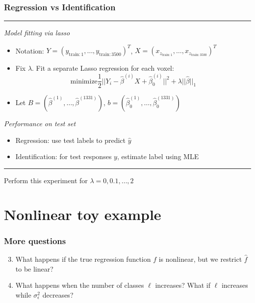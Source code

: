 \documentclass{beamer}
\begin{document}
\begin{frame}
\frametitle{Regression vs Identification}
\noindent\rule[0.5ex]{\linewidth}{0.5pt}
\emph{Model fitting via lasso}
\begin{itemize}
\item Notation: $Y = (y_{\text{train}: 1},\hdots, y_{\text{train}:3500})^T$, $X = (x_{z_{\text{train}: 1}},\hdots, x_{z_{\text{train}:3500}})^T$
\item Fix $\lambda$.  Fit a separate Lasso regression for each voxel:
\[
\text{minimize} \frac{1}{2}||Y_i - \hat{\beta}^{(i)} X + \hat{\beta}_0^{(i)}||^2 + \lambda ||\hat{\beta}||_1
\]
\item Let $B = (\hat{\beta}^{(1)},\hdots, \hat{\beta}^{(1331)})$, $b = (\hat{\beta}_0^{(1)},\hdots, \hat{\beta}_0^{(1331)})$
\end{itemize}
\emph{Performance on test set}
\begin{itemize}
\item Regression: use test labels to predict $\hat{y}$
\item Identification: for test responses $y$, estimate label using MLE
\end{itemize}
\noindent\rule[0.5ex]{\linewidth}{0.5pt}
\vspace{0.1in}
Perform this experiment for $\lambda = 0, 0.1, \hdots, 2$
\end{frame}

\section{Nonlinear toy example}
\frame{\sectionpage}

\begin{frame}
\frametitle{More questions}
\begin{enumerate}
\setcounter{enumi}{2}
\item
What happens if the true regression function $f$ is nonlinear,
but we restrict $\hat{f}$ to be linear?
\item
What happens when the number of classes $\ell$ increases?
What if $\ell$ increases while $\sigma^2_\epsilon$ decreases?
\end{enumerate}
\end{frame}
\end{document}
